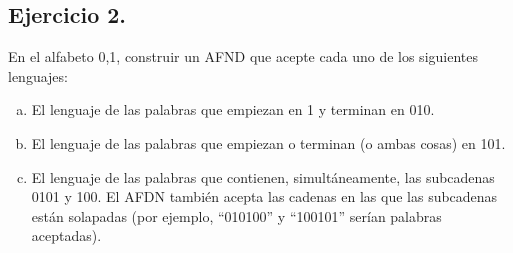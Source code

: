 \documentclass[11pt,a4paper]{article}
\begin{document}
\begin{enumerate}[a)]
\begin{figure}[H]
		\end{figure}
		
	\end{enumerate}

\subsection{Ejercicio 2.} En el alfabeto {0,1}, construir un AFND que acepte cada uno de los siguientes lenguajes:
	\begin{enumerate}[a)]
		\item El lenguaje de las palabras que empiezan en 1 y terminan en 010.
		\item El lenguaje de las palabras que empiezan o terminan (o ambas cosas) en 101.
		\item El lenguaje de las palabras que contienen, simultáneamente, las subcadenas 0101 y 100. El AFDN	también acepta las cadenas en las que las subcadenas están solapadas (por ejemplo, ``010100'' y ``100101'' serían palabras aceptadas).
	\end{enumerate}
	
\end{document}
